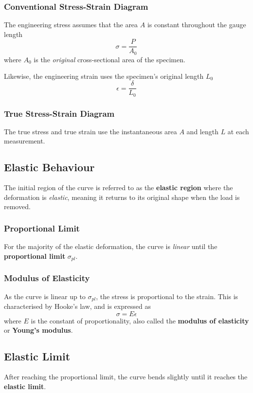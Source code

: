 \documentclass{article}
\begin{document}
\subsubsection{Conventional Stress-Strain Diagram}
The engineering stress assumes that the area \(A\) is constant throughout
the gauge length
\begin{equation*}
    \sigma = \frac{P}{A_0}
\end{equation*}
where \(A_0\) is the \textit{original} cross-sectional area of the specimen.

Likewise, the engineering strain uses the specimen's original length \(L_0\) 
\begin{equation*}
    \epsilon = \frac{\delta}{L_0}
\end{equation*}
\subsubsection{True Stress-Strain Diagram}
The true stress and true strain use the instantaneous area \(A\) and length \(L\)
at each measurement.
\subsection{Elastic Behaviour}
The initial region of the curve is referred to as the \textbf{elastic region} 
where the deformation is \textit{elastic}, meaning it returns to its original 
shape when the load is removed.
\subsubsection{Proportional Limit}
For the majority of the elastic deformation, the curve is \textit{linear}
until the \textbf{proportional limit} \(\sigma_{pl}\).
\subsubsection{Modulus of Elasticity}
As the curve is linear up to \(\sigma_{pl}\), the stress is proportional to the strain. 
This is characterised by Hooke's law, and is expressed as
\begin{equation*}
    \sigma = E \epsilon
\end{equation*}
where \(E\) is the constant of proportionality, also called the \textbf{modulus of elasticity}
or \textbf{Young's modulus}.
\subsection{Elastic Limit}
After reaching the proportional limit, the curve bends slightly until it reaches the \textbf{elastic limit}.
\end{document}
